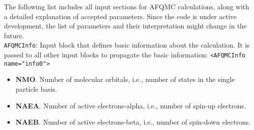 The following list includes all input sections for AFQMC calculations, along with a detailed explanation of accepted parameters. Since the code is under active development, the list of parameters and their interpretation might change in the future.\\

\texttt{AFQMCInfo}: Input block that defines basic information about the calculation. It is passed to all other input blocks to propagate the basic information:
\texttt{<AFQMCInfo name="info0">}
\begin{itemize}
\item \textbf{NMO}. Number of molecular orbitals, i.e., number of states in the single particle basis. 
\item \textbf{NAEA}. Number of active electrons-alpha, i.e., number of spin-up electrons.
\item \textbf{NAEB}. Number of active electrons-beta, i.e., number of spin-down electrons.
\end{itemize}

